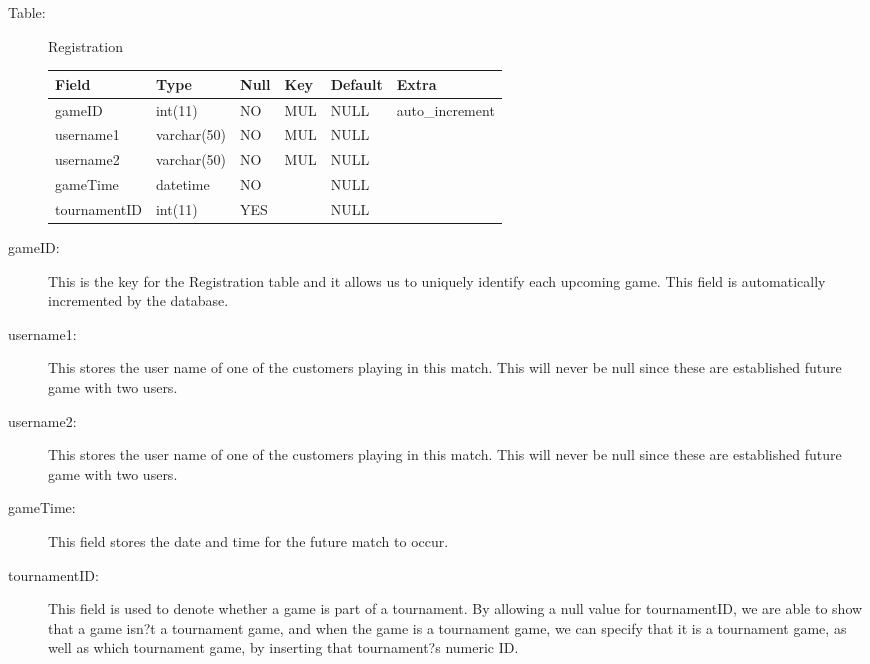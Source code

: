 \begin{description}

\item[Table:] Registration

\begin{center}
    \begin{tabular}{ | l | l | l | l | l | l|}
    \hline
    Field & Type & Null & Key & Default & Extra \\ \hline \hline
    gameID & int(11) & NO & MUL & NULL & auto\_increment \\ \hline
    username1 & varchar(50) & NO & MUL & NULL &\hspace{1 pc}  \\ \hline
    username2 & varchar(50) & NO & MUL& NULL &\hspace{1 pc}  \\ \hline
    gameTime & datetime & NO &\hspace{1 pc} & NULL &\hspace{1 pc}  \\ \hline
    tournamentID & int(11) & YES &\hspace{1 pc} & NULL &\hspace{1 pc}   \\
    \hline
    \end{tabular}
\end{center}

\item[gameID:] This is the key for the Registration table and it allows us to uniquely identify each upcoming game. This field is automatically incremented by the database.
\item[username1:] This stores the user name of one of the customers playing in this match. This will never be null since these are established future game with two users.
\item[username2:] This stores the user name of one of the customers playing in this match. This will never be null since these are established future game with two users.
\item[gameTime:] This field stores the date and time for the future match to occur.
\item[tournamentID:] This field is used to denote whether a game is part of a tournament. By allowing a null value for tournamentID, we are able to show that a game isn?t a tournament game, and when the game is a tournament game, we can specify that it is a tournament game, as well as  which tournament game, by inserting that tournament?s numeric ID.
\end{description}

